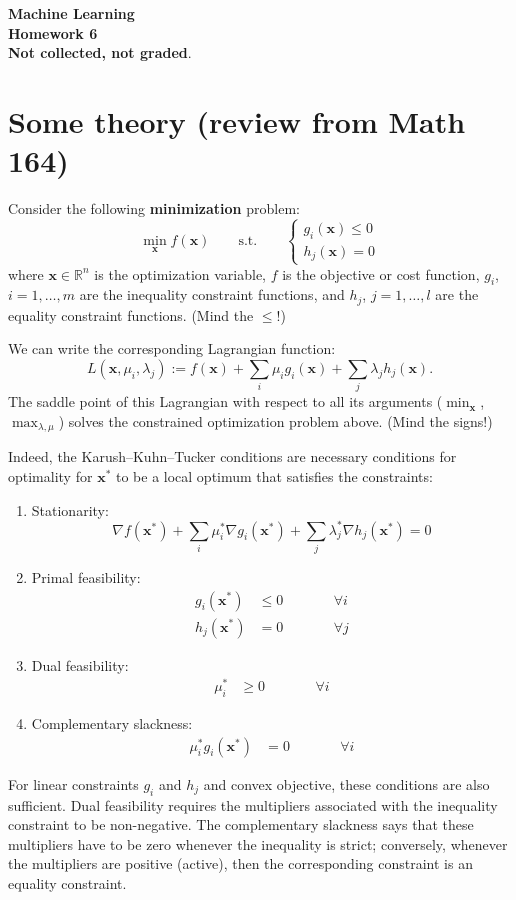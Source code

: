 \documentclass[11pt,noanswers,addpoints]{exam}
\newcommand{\R}{\mathbb R}
\newcommand{\x}{\mathbf x}
\begin{document}
{\Large{\textbf{Machine Learning}}} \\[2mm]
\textbf{\Huge{Homework 6}}\\[2mm]


\textbf{Not collected, not graded}.



\section*{Some theory (review from Math 164)}
Consider the following \textbf{minimization} problem:
$$\min_\x f(\x)\qquad \text{s.t.} \qquad \begin{cases}g_i(\x) \leq 0\\ h_j(\x) = 0\end{cases}$$
where $\x\in\R^n$ is the optimization variable, $f$ is the objective or cost function, $g_i$, $i=1,\ldots,m$ are the inequality constraint functions, and $h_j$, $j=1,\ldots,l$ are the equality constraint functions. (Mind the $\leq$!)

We can write the corresponding Lagrangian function:
$$L(\x,\mu_i,\lambda_j) := f(\x) + \sum_i \mu_i g_i(\x) + \sum_j \lambda_j h_j(\x).$$
The saddle point of this Lagrangian with respect to all its arguments ($\min_\x$, $\max_{\lambda,\mu}$) solves the constrained optimization problem above. (Mind the signs!)

Indeed, the Karush--Kuhn--Tucker conditions are necessary conditions for optimality for $\x^\ast$ to be a local optimum that satisfies the constraints:
\begin{enumerate}
\item Stationarity:
$$\nabla f(\x^\ast) +\sum_i\mu_i^\ast\nabla g_i(\x^\ast) + \sum_j\lambda_j^\ast\nabla h_j(\x^\ast) = 0$$
\item Primal feasibility:
$$\begin{aligned}
g_i(\x^\ast) &\leq 0 &\qquad& \forall i\\
h_j(\x^\ast) &= 0 &\qquad& \forall j
\end{aligned}$$
\item Dual feasibility:
$$\begin{aligned}\mu_i^\ast &\geq 0 &\qquad& \forall i\end{aligned}$$
\item Complementary slackness:
$$\begin{aligned}\mu_i^\ast g_i (\x^\ast)&= 0 &\qquad& \forall i\end{aligned}$$
\end{enumerate}
For linear constraints $g_i$ and $h_j$ and convex objective, these conditions are also sufficient. Dual feasibility requires the multipliers associated with the inequality constraint to be non-negative. The complementary slackness says that these multipliers have to be zero whenever the inequality is strict; conversely, whenever the multipliers are positive (active), then the corresponding constraint is an equality constraint.
\end{document}
